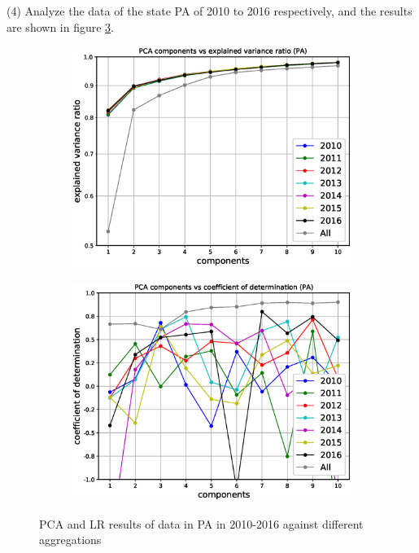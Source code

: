 \documentclass{mcmthesis}
\begin{document}
(4) Analyze the data of the state PA of 2010 to 2016 respectively, and the results are shown in figure \ref{fig:pca_year_PA}.
    \begin{figure}[H]
    \centering
    \begin{subfigure}[b]{0.49\textwidth}
        \includegraphics[width=\textwidth]{../figure/pca_year_PA_ratio.eps}
        \label{fig:pca_year_PA_ratio}
    \end{subfigure}
    \begin{subfigure}[b]{0.49\textwidth}
        \includegraphics[width=\textwidth]{../figure/pca_year_PA_score.eps}
        \label{fig:pca_year_PA_score}
    \end{subfigure}
    \caption{PCA and LR results of data in PA in 2010-2016 against different aggregations}\label{fig:pca_year_PA}
\end{figure}
\end{document}
